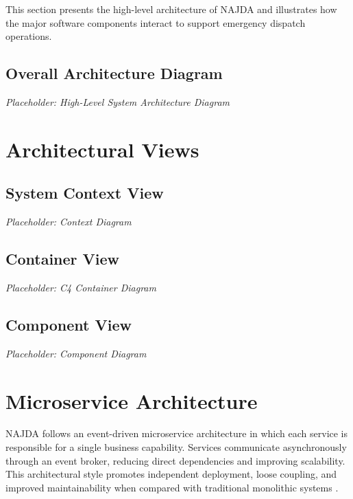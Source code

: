This section presents the high-level architecture of NAJDA and illustrates how the major software components interact to support emergency dispatch operations.

\subsection{Overall Architecture Diagram}

\textit{Placeholder: High-Level System Architecture Diagram}


\section{Architectural Views}

\subsection{System Context View}

\textit{Placeholder: Context Diagram}

\subsection{Container View}

\textit{Placeholder: C4 Container Diagram}

\subsection{Component View}

\textit{Placeholder: Component Diagram}


\section{Microservice Architecture}

NAJDA follows an event-driven microservice architecture in which each service is responsible for a single business capability. Services communicate asynchronously through an event broker, reducing direct dependencies and improving scalability. This architectural style promotes independent deployment, loose coupling, and improved maintainability when compared with traditional monolithic systems \cite{newman2021microservices,richardson2018microservices,bass2022software}.

